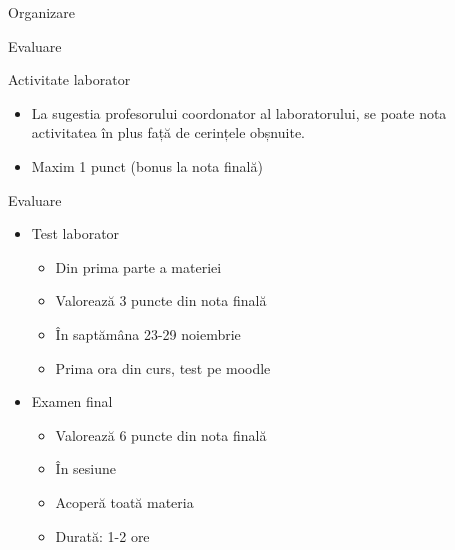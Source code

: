 \documentclass[xcolor=pdftex,romanian,colorlinks]{beamer}
\begin{document}
\begin{section}{Organizare}
\begin{frame}{Evaluare}
\begin{block}{Activitate laborator}
\begin{itemize}

\item La sugestia profesorului coordonator al laboratorului, se poate  nota activitatea în plus față de cerințele obșnuite.
\item Maxim 1 punct (bonus la nota finală)

\end{itemize}
\end{block}

\end{frame}

\begin{frame}{Evaluare}
\begin{itemize}
\item Test laborator
\begin{itemize}
\item Din prima parte a materiei
\item Valorează 3 puncte din nota finală
\item În saptămâna 23-29 noiembrie
\item Prima ora din curs, test pe moodle
\end{itemize}
\medskip

\item Examen final
\begin{itemize}
\item Valorează 6 puncte din nota finală
\item În sesiune
\item Acoperă toată materia
\item Durată: 1-2 ore
\end{itemize}
\end{itemize}
\end{frame}






%
%
%
%
%



\end{section}
\end{document}
